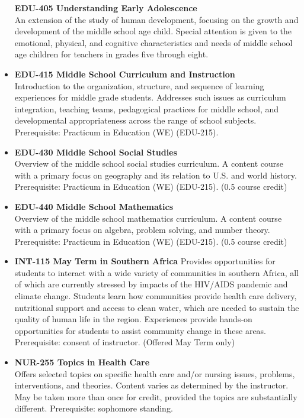 \documentclass[
  letterpaper,
]{scrbook}
\begin{document}
\begin{itemize}
  \textbf{EDU-405 Understanding Early Adolescence}\\
  An extension of the study of human development, focusing on the growth
  and development of the middle school age child. Special attention is
  given to the emotional, physical, and cognitive characteristics and
  needs of middle school age children for teachers in grades five
  through eight.
\item
  \textbf{EDU-415 Middle School Curriculum and Instruction}\\
  Introduction to the organization, structure, and sequence of learning
  experiences for middle grade students. Addresses such issues as
  curriculum integration, teaching teams, pedagogical practices for
  middle school, and developmental appropriateness across the range of
  school subjects. Prerequisite: Practicum in Education (WE) (EDU-215).
\item
  \textbf{EDU-430 Middle School Social Studies}\\
  Overview of the middle school social studies curriculum. A content
  course with a primary focus on geography and its relation to U.S. and
  world history. Prerequisite: Practicum in Education (WE) (EDU-215).
  (0.5 course credit)
\item
  \textbf{EDU-440 Middle School Mathematics}\\
  Overview of the middle school mathematics curriculum. A content course
  with a primary focus on algebra, problem solving, and number theory.
  Prerequisite: Practicum in Education (WE) (EDU-215). (0.5 course
  credit)
\item
  \textbf{INT-115 May Term in Southern Africa} Provides opportunities
  for students to interact with a wide variety of communities in
  southern Africa, all of which are currently stressed by impacts of the
  HIV/AIDS pandemic and climate change. Students learn how communities
  provide health care delivery, nutritional support and access to clean
  water, which are needed to sustain the quality of human life in the
  region. Experiences provide hands-on opportunities for students to
  assist community change in these areas. Prerequisite: consent of
  instructor. (Offered May Term only)
\item
  \textbf{NUR-255 Topics in Health Care}\\
  Offers selected topics on specific health care and/or nursing issues,
  problems, interventions, and theories. Content varies as determined by
  the instructor. May be taken more than once for credit, provided the
  topics are substantially different. Prerequisite: sophomore standing.

\end{itemize}
\end{document}
